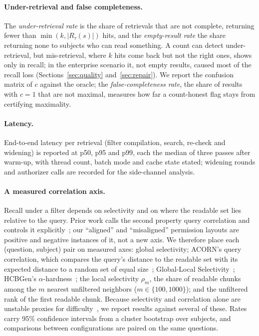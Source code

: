 \paragraph{Under-retrieval and false completeness.}
The \emph{under-retrieval rate} is the share of retrievals that are not complete, returning fewer than
$\min(k, |R_\tau(s)|)$ hits, and the \emph{empty-result rate} the share returning none to subjects who
can read something. A count can detect under-retrieval, but mis-retrieval, where $k$ hits come back
but not the right ones, shows only in recall; in the enterprise scenario it, not empty results, caused
most of the recall loss (Sections~\ref{sec:quality} and~\ref{sec:repair}). We report the confusion
matrix of $c$ against the oracle; the \emph{false-completeness rate}, the share of results with
$c = 1$ that are not maximal, measures how far a count-honest flag stays from certifying maximality.

\paragraph{Latency.}
End-to-end latency per retrieval (filter compilation, search, re-check and widening) is reported at
p50, p95 and p99, each the median of three passes after warm-up, with thread count, batch mode and
cache state stated; widening rounds and authorizer calls are recorded for the side-channel analysis.

\paragraph{A measured correlation axis.}
Recall under a filter depends on selectivity and on where the readable set lies relative to the
query. Prior work calls the second property query correlation and controls it
explicitly~\cite{patel2024acorn,zhang2026vecbench,amanbayev2026filtered,lim2026revisiting}; our
``aligned'' and ``misaligned'' permission layouts are positive and negative instances of it, not a
new axis. We therefore place each (question, subject) pair on measured axes: global selectivity;
ACORN's query correlation, which compares the query's distance to the readable set with its expected
distance to a random set of equal size~\cite{patel2024acorn}; Global-Local
Selectivity~\cite{amanbayev2026filtered}; HCBGen's $\alpha$-hardness~\cite{lim2026revisiting}; the
local selectivity $\rho_m$, the share of readable chunks among the $m$ nearest unfiltered neighbors
($m \in \{100, 1000\}$); and the unfiltered rank of the first readable chunk. Because selectivity and
correlation alone are unstable proxies for difficulty~\cite{lim2026revisiting}, we report results
against several of these. Rates carry 95\% confidence intervals from a cluster bootstrap over
subjects, and comparisons between configurations are paired on the same questions.
